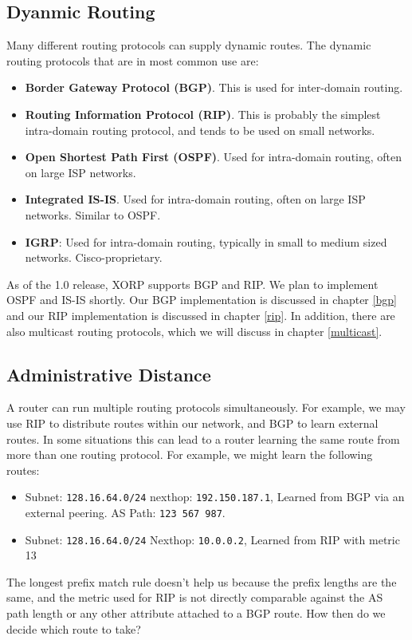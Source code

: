 \subsection{Dyanmic Routing}

Many different routing protocols can supply dynamic routes.  The dynamic
routing protocols that are in most common use are:
\begin{itemize}
\item {\bf Border Gateway Protocol (BGP)}.  This is used for
inter-domain routing.
\item {\bf Routing Information Protocol (RIP)}.  This is probably the
simplest intra-domain routing protocol, and tends to be used on small
networks.
\item {\bf Open Shortest Path First (OSPF)}.  Used for intra-domain routing,
often on large ISP networks.
\item {\bf Integrated IS-IS}.  Used for intra-domain routing, often
on large ISP networks.  Similar to OSPF.
\item {\bf IGRP}: Used for intra-domain routing, typically in small to
medium sized networks.  Cisco-proprietary.
\end{itemize}
As of the 1.0 release, XORP supports BGP and RIP.  We plan to
implement OSPF and IS-IS shortly.  Our BGP implementation is discussed
in chapter \ref{bgp} and our RIP implementation is discussed in
chapter \ref{rip}.  In addition, there are also multicast routing
protocols, which we will discuss in chapter \ref{multicast}.

\subsection{Administrative Distance}

A router can run multiple routing protocols simultaneously.  For
example, we may use RIP to distribute routes within our network, and
BGP to learn external routes.  In some situations this can lead to a
router learning the same route from more than one routing protocol.
For example, we might learn the following routes:
\begin{itemize}
\item Subnet: {\tt 128.16.64.0/24} nexthop: {\tt 192.150.187.1}, Learned from BGP via an external peering. AS Path: {\tt 123 567 987}.
\item Subnet: {\tt 128.16.64.0/24} Nexthop: {\tt 10.0.0.2}, Learned from RIP with metric 13
\end{itemize}
The longest prefix match rule doesn't help us because the prefix
lengths are the same, and the metric used for RIP is not directly
comparable against the AS path length or any other attribute attached
to a BGP route.  How then do we decide which route to take?

